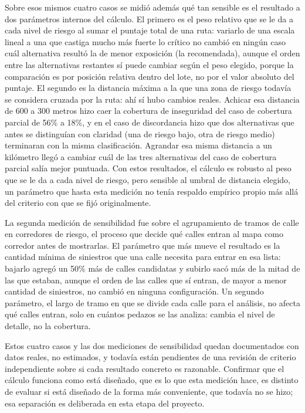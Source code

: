 Sobre esos mismos cuatro casos se midió además qué tan sensible es el
resultado a dos parámetros internos del cálculo. El primero es el peso
relativo que se le da a cada nivel de riesgo al sumar el puntaje total
de una ruta: variarlo de una escala lineal a una que castiga mucho más
fuerte lo crítico no cambió en ningún caso cuál alternativa resultó la
de menor exposición (la recomendada), aunque el orden entre las
alternativas restantes sí puede cambiar según el peso elegido, porque la
comparación es por posición relativa dentro del lote, no por el valor
absoluto del puntaje. El segundo es la distancia máxima a la que una
zona de riesgo todavía se considera cruzada por la ruta: ahí sí hubo
cambios reales. Achicar esa distancia de 600 a 300 metros hizo caer la
cobertura de inseguridad del caso de cobertura parcial de 56\% a 18\%, y
en el caso de discordancia hizo que dos alternativas que antes se
distinguían con claridad (una de riesgo bajo, otra de riesgo medio)
terminaran con la misma clasificación. Agrandar esa misma distancia a un
kilómetro llegó a cambiar cuál de las tres alternativas del caso de
cobertura parcial salía mejor puntuada. Con estos resultados, el cálculo
es robusto al peso que se le da a cada nivel de riesgo, pero sensible al
umbral de distancia elegido, un parámetro que hasta esta medición no
tenía respaldo empírico propio más allá del criterio con que se fijó
originalmente.

La segunda medición de sensibilidad fue sobre el agrupamiento de tramos
de calle en corredores de riesgo, el proceso que decide qué calles
entran al mapa como corredor antes de mostrarlas. El parámetro que más
mueve el resultado es la cantidad mínima de siniestros que una calle
necesita para entrar en esa lista: bajarlo agregó un 50\% más de calles
candidatas y subirlo sacó más de la mitad de las que estaban, aunque el
orden de las calles que sí entran, de mayor a menor cantidad de
siniestros, no cambió en ninguna configuración. Un segundo parámetro, el
largo de tramo en que se divide cada calle para el análisis, no afecta
qué calles entran, solo en cuántos pedazos se las analiza: cambia el
nivel de detalle, no la cobertura.

Estos cuatro casos y las dos mediciones de sensibilidad quedan
documentados con datos reales, no estimados, y todavía están pendientes
de una revisión de criterio independiente sobre si cada resultado
concreto es razonable. Confirmar que el cálculo funciona como está
diseñado, que es lo que esta medición hace, es distinto de evaluar si
está diseñado de la forma más conveniente, que todavía no se hizo; esa
separación es deliberada en esta etapa del proyecto.

